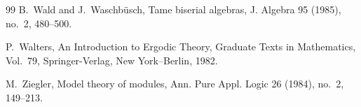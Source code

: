 \documentclass[11pt,a4paper,reqno]{amsart}
\def\emph#1{#1}%
\def\textbf#1{#1}%
\theoremstyle{definition}
\theoremstyle{remark}
\begin{document}
\begin{thebibliography}{99}
B.~Wald and J.~Waschb\"usch,
\emph{Tame biserial algebras},
J. Algebra \textbf{95} (1985), no.~2, 480--500.

P.~Walters,
\emph{An Introduction to Ergodic Theory},
Graduate Texts in Mathematics, Vol.~79, Springer-Verlag, New York--Berlin, 1982.

M.~Ziegler,
\emph{Model theory of modules},
Ann. Pure Appl. Logic \textbf{26} (1984), no.~2, 149--213.

\end{thebibliography}
\end{document}
